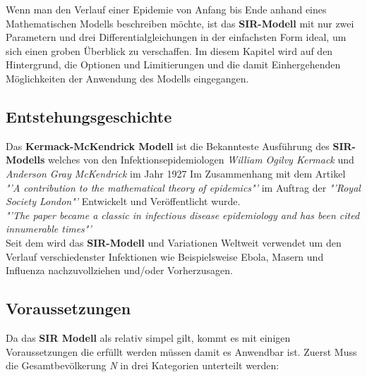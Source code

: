 \documentclass[12pt]{scrartcl} %
\begin{document}
Wenn man den Verlauf einer Epidemie von Anfang bis Ende anhand eines Mathematischen Modells beschreiben möchte, ist das \textbf{SIR-Modell} 
mit nur zwei Parametern und drei Differentialgleichungen in der einfachsten Form ideal, um sich einen groben Überblick zu verschaffen. \cite[vgl.]{4}
Im diesem Kapitel wird auf den Hintergrund, die Optionen und Limitierungen und die damit Einhergehenden Möglichkeiten der Anwendung des Modells eingegangen.


\subsection{Entstehungsgeschichte}

Das \textbf{Kermack-McKendrick Modell} ist die Bekannteste Ausführung des \textbf{SIR-Modells} welches von den Infektionsepidemiologen \textsl{William Ogilvy Kermack} und \textsl{Anderson Gray McKendrick} im Jahr 1927 Im Zusammenhang mit dem Artikel 
\textsl{"'A contribution to the mathematical theory of epidemics"'} \cite{7}
im Auftrag der \textsl{"'Royal Society London"'} \cite[s. 1]{6} Entwickelt und Veröffentlicht wurde. \cite[vgl.]{6} \\

\textsl{"'The paper became a classic in infectious disease epidemiology and has been cited innumerable times"'} \cite[s. 1]{6} \\

Seit dem wird das \textbf{SIR-Modell} und Variationen Weltweit verwendet um den Verlauf verschiedenster Infektionen
wie Beispielsweise Ebola, Masern und Influenza nachzuvollziehen und/oder Vorherzusagen. \cite[vgl. s. 3]{3}



\subsection{Voraussetzungen}

Da das \textbf{SIR Modell} als relativ simpel gilt, kommt es mit einigen Voraussetzungen die erfüllt werden müssen damit es Anwendbar ist.
Zuerst Muss die Gesamtbevölkerung \textit{N} in drei Kategorien unterteilt werden:
\end{document}
